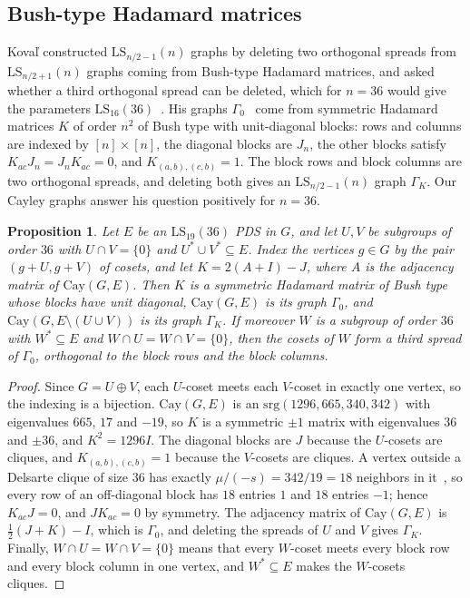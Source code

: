 \documentclass[11pt]{amsart}
\newtheorem{proposition}[theorem]{Proposition}
\theoremstyle{definition}
\newcommand{\srg}{\mathrm{srg}}
\newcommand{\Cay}{\mathrm{Cay}}
\newcommand{\LS}{\mathrm{LS}}
\begin{document}
\subsection{Bush-type Hadamard matrices}
Kova\v{l} constructed $\LS_{n/2-1}(n)$ graphs by deleting two orthogonal spreads from $\LS_{n/2+1}(n)$ graphs coming from Bush-type Hadamard matrices, and asked whether a third orthogonal spread can be deleted, which for $n=36$ would give the parameters $\LS_{16}(36)$~\cite[Section~4.10]{KovalMultiOrbit}. His graphs $\Gamma_0$~\cite[Theorem~4.3]{KovalMultiOrbit} come from symmetric Hadamard matrices $K$ of order $n^2$ of Bush type with unit-diagonal blocks: rows and columns are indexed by $[n]\times[n]$, the diagonal blocks are $J_n$, the other blocks satisfy $K_{ac}J_n=J_nK_{ac}=0$, and $K_{(a,b),(c,b)}=1$. The block rows and block columns are two orthogonal spreads, and deleting both gives an $\LS_{n/2-1}(n)$ graph $\Gamma_K$. Our Cayley graphs answer his question positively for $n=36$.

\begin{proposition}\label{prop:bush}
Let $E$ be an $\LS_{19}(36)$ PDS in $G$, and let $U,V$ be subgroups of order $36$ with $U\cap V=\{0\}$ and $U^*\cup V^*\subseteq E$. Index the vertices $g\in G$ by the pair $(g+U,g+V)$ of cosets, and let $K=2(A+I)-J$, where $A$ is the adjacency matrix of $\Cay(G,E)$. Then $K$ is a symmetric Hadamard matrix of Bush type whose blocks have unit diagonal, $\Cay(G,E)$ is its graph $\Gamma_0$, and $\Cay(G,E\setminus(U\cup V))$ is its graph $\Gamma_K$. If moreover $W$ is a subgroup of order $36$ with $W^*\subseteq E$ and $W\cap U=W\cap V=\{0\}$, then the cosets of $W$ form a third spread of $\Gamma_0$, orthogonal to the block rows and the block columns.
\end{proposition}

\begin{proof}
Since $G=U\oplus V$, each $U$-coset meets each $V$-coset in exactly one vertex, so the indexing is a bijection. $\Cay(G,E)$ is an $\srg(1296,665,340,342)$ with eigenvalues $665$, $17$ and $-19$, so $K$ is a symmetric $\pm1$ matrix with eigenvalues $36$ and $\pm36$, and $K^2=1296I$. The diagonal blocks are $J$ because the $U$-cosets are cliques, and $K_{(a,b),(c,b)}=1$ because the $V$-cosets are cliques. A vertex outside a Delsarte clique of size $36$ has exactly $\mu/(-s)=342/19=18$ neighbors in it~\cite{BvM2022}, so every row of an off-diagonal block has $18$ entries $1$ and $18$ entries $-1$; hence $K_{ac}J=0$, and $JK_{ac}=0$ by symmetry. The adjacency matrix of $\Cay(G,E)$ is $\frac12(J+K)-I$, which is $\Gamma_0$, and deleting the spreads of $U$ and $V$ gives $\Gamma_K$. Finally, $W\cap U=W\cap V=\{0\}$ means that every $W$-coset meets every block row and every block column in one vertex, and $W^*\subseteq E$ makes the $W$-cosets cliques.
\end{proof}
\end{document}
